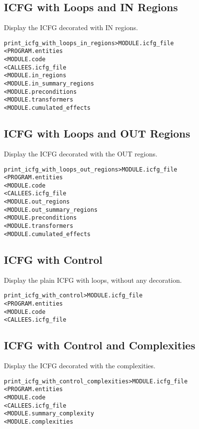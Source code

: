 \documentclass[a4paper]{report}
\newenvironment{PipsMake}{\begin{alltt}}{\end{alltt}}
\begin{document}
\subsection{ICFG with Loops and IN Regions}

Display the ICFG decorated with IN regions.
\begin{PipsMake}
print_icfg_with_loops_in_regions         > MODULE.icfg_file
        < PROGRAM.entities
        < MODULE.code
        < CALLEES.icfg_file
        < MODULE.in_regions
        < MODULE.in_summary_regions
        < MODULE.preconditions
        < MODULE.transformers
        < MODULE.cumulated_effects
\end{PipsMake}

\subsection{ICFG with Loops and OUT Regions}

Display the ICFG decorated with the OUT regions.
\begin{PipsMake}
print_icfg_with_loops_out_regions        > MODULE.icfg_file
        < PROGRAM.entities
        < MODULE.code
        < CALLEES.icfg_file
        < MODULE.out_regions
        < MODULE.out_summary_regions
        < MODULE.preconditions
        < MODULE.transformers
        < MODULE.cumulated_effects
\end{PipsMake}

\subsection{ICFG with Control}

Display the plain ICFG with loops, without any decoration.
\begin{PipsMake}
print_icfg_with_control         > MODULE.icfg_file
        < PROGRAM.entities
        < MODULE.code
        < CALLEES.icfg_file
\end{PipsMake}

\subsection{ICFG with Control and Complexities}

Display the ICFG decorated with the complexities.
\begin{PipsMake}
print_icfg_with_control_complexities    > MODULE.icfg_file
        < PROGRAM.entities
        < MODULE.code
        < CALLEES.icfg_file
        < MODULE.summary_complexity
        < MODULE.complexities
\end{PipsMake}
\end{document}
